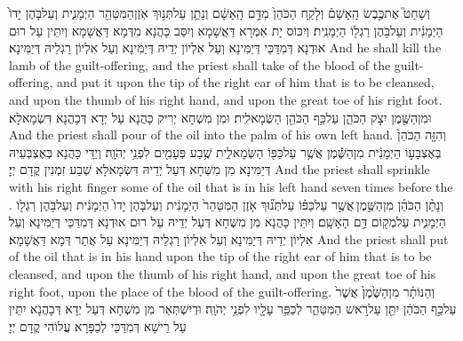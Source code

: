 {וְשָׁחַט֮ אֶת\maqqaf כֶּ֣בֶשׂ הָֽאָשָׁם֒ וְלָקַ֤ח הַכֹּהֵן֙ מִדַּ֣ם הָֽאָשָׁ֔ם וְנָתַ֛ן עַל\maqqaf תְּנ֥וּךְ אֹֽזֶן\maqqaf הַמִּטַּהֵ֖ר הַיְמָנִ֑ית וְעַל\maqqaf בֹּ֤הֶן יָדוֹ֙ הַיְמָנִ֔ית וְעַל\maqqaf בֹּ֥הֶן רַגְל֖וֹ הַיְמָנִֽית׃}
{וְיִכּוֹס יָת אִמְּרָא דַּאֲשָׁמָא וְיִסַּב כָּהֲנָא מִדְּמָא דַּאֲשָׁמָא וְיִתֵּין עַל רוּם אוּדְנָא דְּמִדַּכֵּי דְּיַמִּינָא וְעַל אִלְיוֹן יְדֵיהּ דְּיַמִּינָא וְעַל אִלְיוֹן רַגְלֵיהּ דְּיַמִּינָא׃}
{And he shall kill the lamb of the guilt-offering, and the priest shall take of the blood of the guilt-offering, and put it upon the tip of the right ear of him that is to be cleansed, and upon the thumb of his right hand, and upon the great toe of his right foot.}{}
{וּמִן\maqqaf הַשֶּׁ֖מֶן יִצֹ֣ק הַכֹּהֵ֑ן עַל\maqqaf כַּ֥ף הַכֹּהֵ֖ן הַשְּׂמָאלִֽית׃}
{וּמִן מִשְׁחָא יְרִיק כָּהֲנָא עַל יְדָא דְּכָהֲנָא דִּשְׂמָאלָא׃}
{And the priest shall pour of the oil into the palm of his own left hand.}{}
{וְהִזָּ֤ה הַכֹּהֵן֙ בְּאֶצְבָּע֣וֹ הַיְמָנִ֔ית מִן\maqqaf הַשֶּׁ֕מֶן אֲשֶׁ֥ר עַל\maqqaf כַּפּ֖וֹ הַשְּׂמָאלִ֑ית שֶׁ֥בַע פְּעָמִ֖ים לִפְנֵ֥י יְהֹוָֽה׃}
{וְיַדֵּי כָּהֲנָא בְּאֶצְבְּעֵיהּ דְּיַמִּינָא מִן מִשְׁחָא דְּעַל יְדֵיהּ דִּשְׂמָאלָא שְׁבַע זִמְנִין קֳדָם יְיָ׃}
{And the priest shall sprinkle with his right finger some of the oil that is in his left hand seven times before the \lord.}{}
{וְנָתַ֨ן הַכֹּהֵ֜ן מִן\maqqaf הַשֶּׁ֣מֶן \legarmeh  אֲשֶׁ֣ר עַל\maqqaf כַּפּ֗וֹ עַל\maqqaf תְּנ֞וּךְ אֹ֤זֶן הַמִּטַּהֵר֙ הַיְמָנִ֔ית וְעַל\maqqaf בֹּ֤הֶן יָדוֹ֙ הַיְמָנִ֔ית וְעַל\maqqaf בֹּ֥הֶן רַגְל֖וֹ הַיְמָנִ֑ית עַל\maqqaf מְק֖וֹם דַּ֥ם הָאָשָֽׁם׃}
{וְיִתֵּין כָּהֲנָא מִן מִשְׁחָא דְּעַל יְדֵיהּ עַל רוּם אוּדְנָא דְּמִדַּכֵּי דְּיַמִּינָא וְעַל אִלְיוֹן יְדֵיהּ דְּיַמִּינָא וְעַל אִלְיוֹן רַגְלֵיהּ דְּיַמִּינָא עַל אֲתַר דְּמָא דַּאֲשָׁמָא׃}
{And the priest shall put of the oil that is in his hand upon the tip of the right ear of him that is to be cleansed, and upon the thumb of his right hand, and upon the great toe of his right foot, upon the place of the blood of the guilt-offering.}{}
{וְהַנּוֹתָ֗ר מִן\maqqaf הַשֶּׁ֙מֶן֙ אֲשֶׁר֙ עַל\maqqaf כַּ֣ף הַכֹּהֵ֔ן יִתֵּ֖ן עַל\maqqaf רֹ֣אשׁ הַמִּטַּהֵ֑ר לְכַפֵּ֥ר עָלָ֖יו לִפְנֵ֥י יְהֹוָֽה׃}
{וּדְיִשְׁתְּאַר מִן מִשְׁחָא דְּעַל יְדָא דְּכָהֲנָא יִתֵּין עַל רֵישָׁא דְּמִדַּכֵּי לְכַפָּרָא עֲלוֹהִי קֳדָם יְיָ׃}
